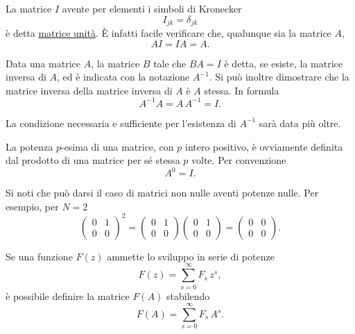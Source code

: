 \documentclass[11pt, a4paper]{book}
\numberwithin{equation}{section}
\begin{document}
La matrice $I$ avente per elementi i simboli di Kronecker
\begin{equation}
    I_{jk} = \delta_{jk}
    \tag{16}
\end{equation}
è detta \underline{matrice unità}. È infatti facile verificare che, qualunque sia la matrice $A$,
\begin{equation}
    AI = IA = A.
    \tag{17}
\end{equation}

Data una matrice $A$, la matrice $B$ tale che $BA = I$ è detta, se esiste, la matrice inversa di $A$, ed è indicata con la notazione $A^{-1}$. Si può inoltre dimostrare che la matrice inversa della matrice inversa di $A$ è $A$ stessa. In formula
\begin{equation}
    A^{-1} A = A\, A^{-1} = I.
    \tag{18}
\end{equation}

La condizione necessaria e sufficiente per l'esistenza di $A^{-1}$ sarà data più oltre.

La potenza $p$-esima di una matrice, con $p$ intero positivo, è ovviamente definita dal prodotto di una matrice per sé stessa $p$ volte. Per convenzione
\begin{equation}
    A^0 = I.
    \tag{19}
\end{equation}

Si noti che può darsi il caso di matrici non nulle aventi potenze nulle. Per esempio, per $N = 2$
\[
\begin{pmatrix} 0 & 1 \\ 0 & 0 \end{pmatrix}^2
=
\begin{pmatrix} 0 & 1 \\ 0 & 0 \end{pmatrix}
\begin{pmatrix} 0 & 1 \\ 0 & 0 \end{pmatrix}
=
\begin{pmatrix} 0 & 0 \\ 0 & 0 \end{pmatrix}.
\]

Se una funzione $F(z)$ ammette lo sviluppo in serie di potenze
\begin{equation}
    F(z) = \sum_{s=0}^{\infty} F_s\, z^s,
    \tag{20}
\end{equation}
è possibile definire la matrice $F(A)$ stabilendo
\begin{equation}
    F(A) = \sum_{s=0}^{\infty} F_s\, A^s.
    \tag{21}
\end{equation}
\end{document}
